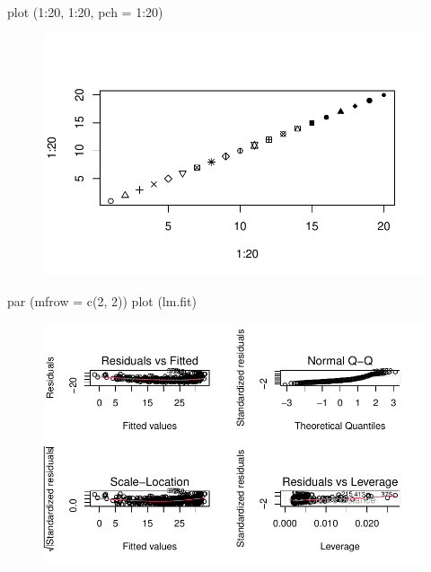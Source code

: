 \documentclass[
  letterpaper,
  DIV=11,
  numbers=noendperiod]{scrartcl}
\newenvironment{Shaded}{\begin{snugshade}}{\end{snugshade}}
\newcommand{\AttributeTok}[1]{\textcolor[rgb]{0.40,0.45,0.13}{#1}}
\newcommand{\DecValTok}[1]{\textcolor[rgb]{0.68,0.00,0.00}{#1}}
\newcommand{\FunctionTok}[1]{\textcolor[rgb]{0.28,0.35,0.67}{#1}}
\newcommand{\NormalTok}[1]{\textcolor[rgb]{0.00,0.23,0.31}{#1}}
\newcommand{\SpecialCharTok}[1]{\textcolor[rgb]{0.37,0.37,0.37}{#1}}
\begin{document}
\begin{Shaded}
\begin{Highlighting}[]
\FunctionTok{plot}\NormalTok{ (}\DecValTok{1}\SpecialCharTok{:}\DecValTok{20}\NormalTok{, }\DecValTok{1}\SpecialCharTok{:}\DecValTok{20}\NormalTok{, }\AttributeTok{pch =} \DecValTok{1}\SpecialCharTok{:}\DecValTok{20}\NormalTok{)}
\end{Highlighting}
\end{Shaded}

\begin{figure}[H]

{\centering \includegraphics{Regresion-lineal-simple-y-multiple_files/figure-pdf/unnamed-chunk-12-5.pdf}

}

\end{figure}

\begin{Shaded}
\begin{Highlighting}[]
\FunctionTok{par}\NormalTok{ (}\AttributeTok{mfrow =} \FunctionTok{c}\NormalTok{(}\DecValTok{2}\NormalTok{, }\DecValTok{2}\NormalTok{))}
\FunctionTok{plot}\NormalTok{ (lm.fit)}
\end{Highlighting}
\end{Shaded}

\begin{figure}[H]

{\centering \includegraphics{Regresion-lineal-simple-y-multiple_files/figure-pdf/unnamed-chunk-13-1.pdf}

}

\end{figure}
\end{document}
